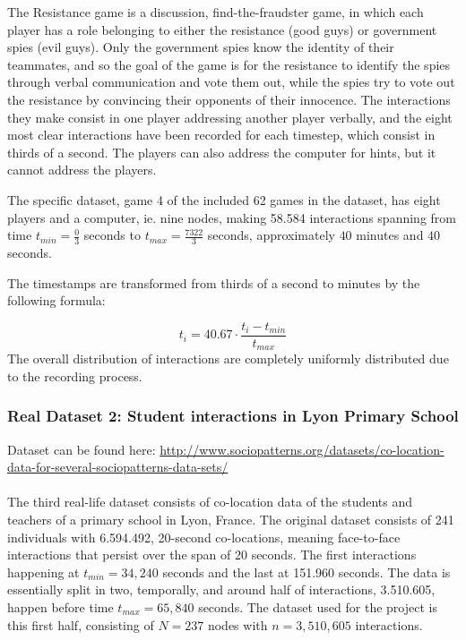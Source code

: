 The Resistance game is a discussion, find-the-fraudster game, in which each player has a role belonging to either the resistance (good guys) or government spies (evil guys).
Only the government spies know the identity of their teammates, and so the goal of the game is for the resistance to identify the spies through verbal communication and vote them out, while the spies try to vote out the resistance by convincing their opponents of their innocence. 
The interactions they make consist in one player addressing another player verbally, and the eight most clear interactions have been recorded for each timestep, which consist in thirds of a second. 
The players can also address the computer for hints, but it cannot address the players.

The specific dataset, game 4 of the included 62 games in the dataset, has eight players and a computer, ie. nine nodes, making 58.584 interactions spanning from time $t_{min} = \frac{0}{3}$ seconds to $t_{max} = \frac{7322}{3}$ seconds, approximately $40$ minutes and $40$ seconds.

The timestamps are transformed from thirds of a second to minutes by the following formula:

\begin{equation}
    t_i = 40.67 \cdot \frac{t_i - t_{min}}{t_{max}}
\end{equation}
The overall distribution of interactions are completely uniformly distributed due to the recording process.




\subsubsection{Real Dataset 2: Student interactions in Lyon Primary School}
\label{sec:Data:RealData:RealDataset3}
Dataset can be found here: \href{http://www.sociopatterns.org/datasets/co-location-data-for-several-sociopatterns-data-sets/}{http://www.sociopatterns.org/datasets/co-location-data-for-several-sociopatterns-data-sets/}
\\\\
The third real-life dataset consists of co-location data of the students and teachers of a primary school in Lyon, France.
The original dataset consists of 241 individuals with 6.594.492, 20-second co-locations, meaning face-to-face interactions that persist over the span of 20 seconds.
The first interactions happening at $t_{min} = 34,240$ seconds and the last at 151.960 seconds.
The data is essentially split in two, temporally, and around half of interactions, 3.510.605, happen before time $t_{max} = 65,840$ seconds.
The dataset used for the project is this first half, consisting of $N = 237$ nodes with $n = 3,510,605$ interactions.

